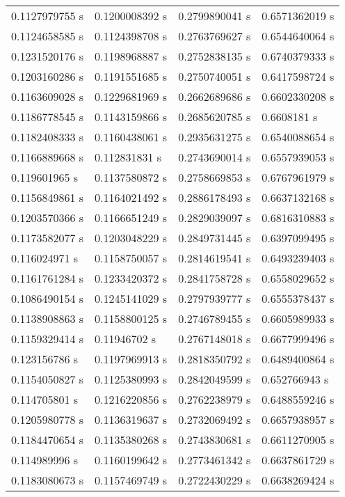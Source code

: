 \begin{table}[]
\begin{tabular}{llll}
    0.1127979755 s & 0.1200008392 s & 0.2799890041 s & 0.6571362019 s \\
    0.1124658585 s & 0.1124398708 s & 0.2763769627 s & 0.6544640064 s \\
    0.1231520176 s & 0.1198968887 s & 0.2752838135 s & 0.6740379333 s \\
    0.1203160286 s & 0.1191551685 s & 0.2750740051 s & 0.6417598724 s \\
    0.1163609028 s & 0.1229681969 s & 0.2662689686 s & 0.6602330208 s \\
    0.1186778545 s & 0.1143159866 s & 0.2685620785 s & 0.6608181 s    \\
    0.1182408333 s & 0.1160438061 s & 0.2935631275 s & 0.6540088654 s \\
    0.1166889668 s & 0.112831831 s  & 0.2743690014 s & 0.6557939053 s \\
    0.119601965 s  & 0.1137580872 s & 0.2758669853 s & 0.6767961979 s \\
    0.1156849861 s & 0.1164021492 s & 0.2886178493 s & 0.6637132168 s \\
    0.1203570366 s & 0.1166651249 s & 0.2829039097 s & 0.6816310883 s \\
    0.1173582077 s & 0.1203048229 s & 0.2849731445 s & 0.6397099495 s \\
    0.116024971 s  & 0.1158750057 s & 0.2814619541 s & 0.6493239403 s \\
    0.1161761284 s & 0.1233420372 s & 0.2841758728 s & 0.6558029652 s \\
    0.1086490154 s & 0.1245141029 s & 0.2797939777 s & 0.6555378437 s \\
    0.1138908863 s & 0.1158800125 s & 0.2746789455 s & 0.6605989933 s \\
    0.1159329414 s & 0.11946702 s   & 0.2767148018 s & 0.6677999496 s \\
    0.123156786 s  & 0.1197969913 s & 0.2818350792 s & 0.6489400864 s \\
    0.1154050827 s & 0.1125380993 s & 0.2842049599 s & 0.652766943 s  \\
    0.114705801 s  & 0.1216220856 s & 0.2762238979 s & 0.6488559246 s \\
    0.1205980778 s & 0.1136319637 s & 0.2732069492 s & 0.6657938957 s \\
    0.1184470654 s & 0.1135380268 s & 0.2743830681 s & 0.6611270905 s \\
    0.114989996 s  & 0.1160199642 s & 0.2773461342 s & 0.6637861729 s \\
    0.1183080673 s & 0.1157469749 s & 0.2722430229 s & 0.6638269424 s \\

\end{tabular}
\end{table}
